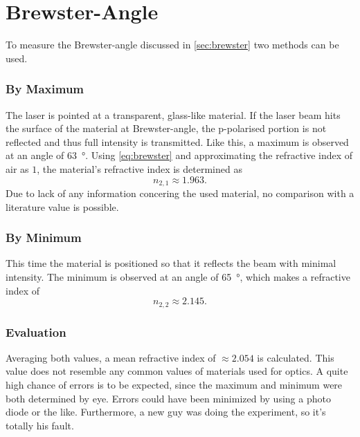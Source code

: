 \chapter{Brewster-Angle}
To measure the Brewster-angle discussed in \autoref{sec:brewster} two methods can be used.

\subsection{By Maximum}
The laser is pointed at a transparent, glass-like material.
If the laser beam hits the surface of the material at Brewster-angle, the p-polarised portion is not reflected and thus full intensity is transmitted.
Like this, a maximum is observed at an angle of \SI{63}{\degree}.
Using \autoref{eq:brewster} and approximating the refractive index of air as $1$, the material's refractive index is determined as
\begin{equation*}
	n_{2,1}\approx\num{1.963}.
\end{equation*}
Due to lack of any information concering the used material, no comparison with a literature value is possible.

\subsection{By Minimum}
This time the material is positioned so that it reflects the beam with minimal intensity.
The minimum is observed at an angle of \SI{65}{\degree}, which makes a refractive index of
\begin{equation*}
	n_{2,2}\approx\num{2.145}.
\end{equation*}

\subsection{Evaluation}
Averaging both values, a mean refractive index of $\approx\num{2.054}$ is calculated.
This value does not resemble any common values of materials used for optics.
A quite high chance of errors is to be expected, since the maximum and minimum were both determined by eye.
Errors could have been minimized by using a photo diode or the like.
Furthermore, a new guy was doing the experiment, so it's totally his fault. 
